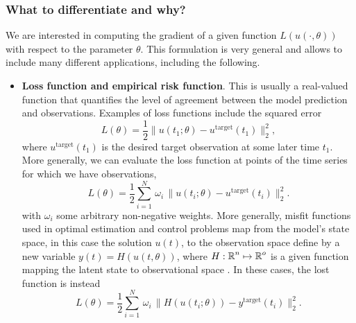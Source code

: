 

\subsubsection{What to differentiate and why?}

We are interested in computing the gradient of a given function $L(u(\cdot, \theta))$ with respect to the parameter $\theta$.
This formulation is very general and allows to include many different applications, including the following. 
\begin{itemize}
    \item \textbf{Loss function and empirical risk function}. This is usually a real-valued function that quantifies the level of agreement between the model prediction and observations. Examples of loss functions include the squared error
    \begin{equation}
         L(\theta) = \frac{1}{2} \| u(t_1; \theta) - u^{\text{target}}(t_1) \|_2^2,
         \label{eq:quadratic-loss-function}
    \end{equation}
    where $u^{\text{target}}(t_1)$ is the desired target observation at some later time $t_1$.
    More generally, we can evaluate the loss function at points of the time series for which we have observations, 
    \begin{equation}
        L(\theta) 
        = 
        \frac{1}{2} \sum_{i=1}^N 
        \, \omega_i \,
        \| u(t_i; \theta) - u^{\text{target}}(t_i) \|_2^2.
    \end{equation}
    with $\omega_i$ some arbitrary non-negative weights.
    More generally, misfit functions used in optimal estimation and control problems map from the model's state space, in this case the solution $u(t)$, to the observation space define by a new variable $y(t) = H(u(t, \theta))$, where $H: \operatorname{\mathbb{R}}^n \mapsto \operatorname{\mathbb{R}}^o$ is a given function mapping the latent state to observational space \cite{1975-Bryson-Ho-optimal-control}. 
    In these cases, the lost function is instead 
    \begin{equation}
        L(\theta) 
        =
        \frac{1}{2} 
        \sum_{i=1}^N
        \, \omega_i \,
        \| H(u(t_i; \theta)) - y^{\text{target}}(t_i) \|_2^2.
        \label{eq:loss-state-observation}

\end{equation}
\end{itemize}
